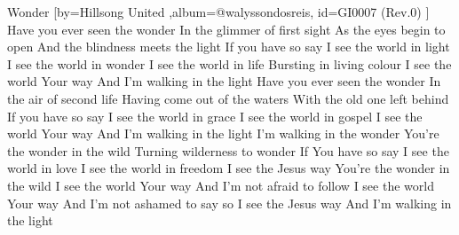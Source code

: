 \beginsong
{Wonder %
}[by={Hillsong United  %
},album={@walyssondosreis},
id={GI0007 %
(Rev.0) %
}]
\beginverse
Have you ever seen the wonder
In the glimmer of first sight
As the eyes begin to open
And the blindness meets the light
If you have so say
\endverse
\beginchorus
I see the world in light
I see the world in wonder
I see the world in life
Bursting in living colour
I see the world Your way
And I'm walking in the light
\endchorus
\beginverse
Have you ever seen the wonder
In the air of second life
Having come out of the waters
With the old one left behind
If you have so say
\endverse
\beginverse
I see the world in grace
I see the world in gospel
I see the world Your way
And I'm walking in the light
I'm walking in the wonder
You're the wonder in the wild
Turning wilderness to wonder
If You have so say
I see the world in love
I see the world in freedom
I see the Jesus way
You're the wonder in the wild
\endverse
\beginverse
I see the world Your way
And I'm not afraid to follow
I see the world Your way
And I'm not ashamed to say so
I see the Jesus way
And I'm walking in the light
\endverse

